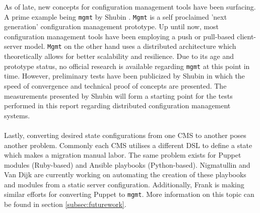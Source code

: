 As of late, new concepts for configuration management tools have been surfacing. A prime example being \texttt{mgmt} by Shubin \cite{shubin2016}. \texttt{Mgmt} is a self proclaimed 'next generation' configuration management prototype. Up until now, most configuration management tools have been employing a push or pull-based client-server model. \texttt{Mgmt} on the other hand uses a distributed architecture which theoretically allows for better scalability and resilience. Due to its age and prototype status, no official research is available regarding \texttt{mgmt} at this point in time. However, preliminary tests have been publicized by Shubin in which the speed of convergence and technical proof of concepts are presented. The measurements presented by Shubin will form a starting point for the tests performed in this report regarding distributed configuration management systems. 
\\\\
Lastly, converting desired state configurations from one CMS to another poses another problem. Commonly each CMS utilises a different DSL to define a state which makes a migration manual labor. The same problem exists for Puppet modules (Ruby-based) and Ansible playbooks (Python-based). Nigmatullin and Van Dijk \cite{marat_2016} are currently working on automating the creation of these playbooks and modules from a static server configuration. Additionally, Frank \cite{frank_2016} is making similar efforts for converting Puppet to \texttt{mgmt}. More information on this topic can be found in section \ref{subsec:futurework}. 
